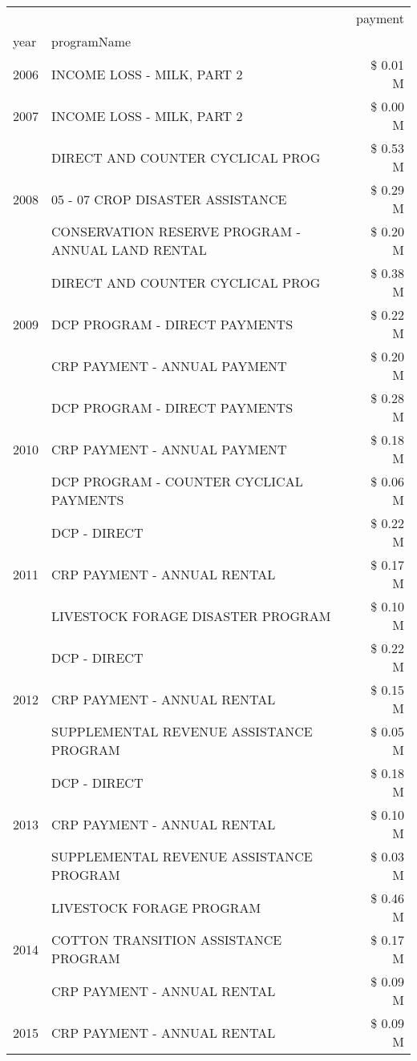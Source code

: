 \begin{tabular}{llr}
\toprule
 &  & payment \\
year & programName &  \\
\midrule
2006 & INCOME LOSS - MILK, PART 2 & \$ 0.01 M \\
\cline{1-3}
2007 & INCOME LOSS - MILK, PART 2 & \$ 0.00 M \\
\cline{1-3}
\multirow[t]{3}{*}{2008} & DIRECT AND COUNTER CYCLICAL PROG & \$ 0.53 M \\
 & 05 - 07 CROP DISASTER ASSISTANCE & \$ 0.29 M \\
 & CONSERVATION RESERVE PROGRAM - ANNUAL LAND RENTAL & \$ 0.20 M \\
\cline{1-3}
\multirow[t]{3}{*}{2009} & DIRECT AND COUNTER CYCLICAL PROG & \$ 0.38 M \\
 & DCP PROGRAM - DIRECT PAYMENTS & \$ 0.22 M \\
 & CRP PAYMENT - ANNUAL PAYMENT & \$ 0.20 M \\
\cline{1-3}
\multirow[t]{3}{*}{2010} & DCP PROGRAM - DIRECT PAYMENTS & \$ 0.28 M \\
 & CRP PAYMENT - ANNUAL PAYMENT & \$ 0.18 M \\
 & DCP PROGRAM - COUNTER CYCLICAL PAYMENTS & \$ 0.06 M \\
\cline{1-3}
\multirow[t]{3}{*}{2011} & DCP - DIRECT & \$ 0.22 M \\
 & CRP PAYMENT - ANNUAL RENTAL & \$ 0.17 M \\
 & LIVESTOCK FORAGE DISASTER PROGRAM & \$ 0.10 M \\
\cline{1-3}
\multirow[t]{3}{*}{2012} & DCP - DIRECT & \$ 0.22 M \\
 & CRP PAYMENT - ANNUAL RENTAL & \$ 0.15 M \\
 & SUPPLEMENTAL REVENUE ASSISTANCE PROGRAM & \$ 0.05 M \\
\cline{1-3}
\multirow[t]{3}{*}{2013} & DCP - DIRECT & \$ 0.18 M \\
 & CRP PAYMENT - ANNUAL RENTAL & \$ 0.10 M \\
 & SUPPLEMENTAL REVENUE ASSISTANCE PROGRAM & \$ 0.03 M \\
\cline{1-3}
\multirow[t]{3}{*}{2014} & LIVESTOCK FORAGE PROGRAM & \$ 0.46 M \\
 & COTTON TRANSITION ASSISTANCE PROGRAM & \$ 0.17 M \\
 & CRP PAYMENT - ANNUAL RENTAL & \$ 0.09 M \\
\cline{1-3}
\multirow[t]{3}{*}{2015} & CRP PAYMENT - ANNUAL RENTAL & \$ 0.09 M \\

\end{tabular}
